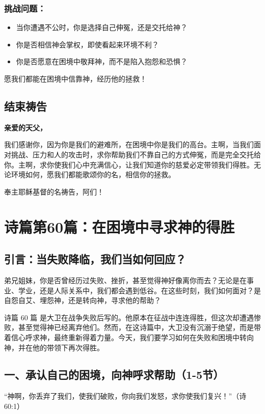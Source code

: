 \documentclass[a4paper, 12pt]{article}
\begin{document}
\subsubsection*{挑战问题：}
\begin{itemize}
    \item 当你遭遇不公时，你是选择自己伸冤，还是交托给神？

    \item 你是否相信神会掌权，即使看起来环境不利？

    \item 你是否愿意在困境中敬拜神，而不是陷入抱怨和恐惧？

    
\end{itemize}

愿我们都能在困境中信靠神，经历他的拯救！

\subsection*{结束祷告}
\textbf{亲爱的天父，}

我们感谢你，因为你是我们的避难所，在困境中你是我们的高台。主啊，当我们面对挑战、压力和人的攻击时，求你帮助我们不靠自己的方式伸冤，而是完全交托给你。主啊，求你使我们心中充满信心，让我们知道你的慈爱必定带领我们得胜。无论环境如何，愿我们都能歌颂你的名，相信你的拯救。

奉主耶稣基督的名祷告，阿们！
\newpage
\section{诗篇第60篇：在困境中寻求神的得胜}
\subsection*{引言：当失败降临，我们当如何回应？}
\hspace{0.6cm}弟兄姐妹，你是否曾经历过失败、挫折，甚至觉得神好像离你而去？无论是在事业、学业，还是人际关系中，我们都会遇到低谷。在这些时刻，我们如何面对？是自怨自艾、埋怨神，还是转向神，寻求他的帮助？

诗篇 60 篇 是大卫在战争失败后写的。他原本在征战中连连得胜，但这次却遭遇惨败，甚至觉得神已经离弃他们。然而，在这诗篇中，大卫没有沉溺于绝望，而是带着信心呼求神，最终重新得着力量。今天，我们要学习如何在失败和困境中转向神，并在他的带领下再次得胜。

\subsection*{一、承认自己的困境，向神呼求帮助（1-5节）}
“神啊，你丢弃了我们，使我们破败，你向我们发怒，求你使我们复兴！”（诗 60:1）
\end{document}
